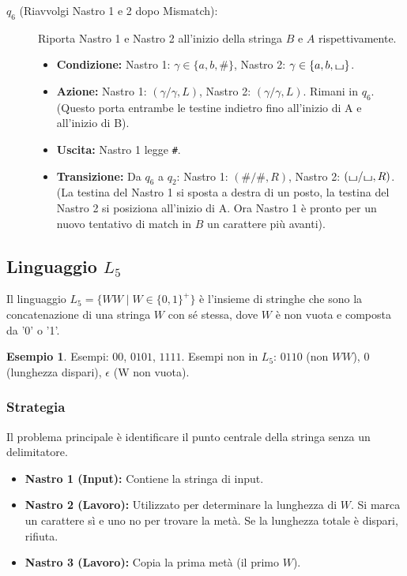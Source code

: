 \documentclass[a4paper]{article}
\theoremstyle{definition} %
\newtheorem{example}{Esempio}
\newcommand{\blankS}{\ensuremath{\raisebox{-0.15ex}{\scalebox{1.3}[0.7]{$\sqcup$}}}}
\begin{document}
\begin{description}
    \item[$q_6$ (Riavvolgi Nastro 1 e 2 dopo Mismatch):] Riporta Nastro 1 e Nastro 2 all'inizio della stringa $B$ e $A$ rispettivamente.
    \begin{itemize}
        \item \textbf{Condizione:} Nastro 1: $\gamma \in \{a,b,\#\}$, Nastro 2: $\gamma \in \{a,b,\blankS\}$.
        \item \textbf{Azione:} Nastro 1: $(\gamma/\gamma, L)$, Nastro 2: $(\gamma/\gamma, L)$. Rimani in $q_6$. (Questo porta entrambe le testine indietro fino all'inizio di A e all'inizio di B).
        \item \textbf{Uscita:} Nastro 1 legge \texttt{\#}.
        \item \textbf{Transizione:} Da $q_6$ a $q_2$: Nastro 1: $(\#/\#, R)$, Nastro 2: $(\blankS/\blankS, R)$. (La testina del Nastro 1 si sposta a destra di un posto, la testina del Nastro 2 si posiziona all'inizio di A. Ora Nastro 1 è pronto per un nuovo tentativo di match in $B$ un carattere più avanti).
    \end{itemize}
\end{description}

\subsection{Linguaggio $L_5$}
Il linguaggio $L_5 = \{WW \mid W \in \{0,1\}^+\}$ è l'insieme di stringhe che sono la concatenazione di una stringa $W$ con sé stessa, dove $W$ è non vuota e composta da '0' o '1'.
\begin{example}
Esempi: $00$, $0101$, $1111$.
Esempi non in $L_5$: $0110$ (non $WW$), $0$ (lunghezza dispari), $\epsilon$ (W non vuota).
\end{example}

\subsubsection{Strategia}
Il problema principale è identificare il punto centrale della stringa senza un delimitatore.
\begin{itemize}
    \item \textbf{Nastro 1 (Input):} Contiene la stringa di input.
    \item \textbf{Nastro 2 (Lavoro):} Utilizzato per determinare la lunghezza di $W$. Si marca un carattere sì e uno no per trovare la metà. Se la lunghezza totale è dispari, rifiuta.
    \item \textbf{Nastro 3 (Lavoro):} Copia la prima metà (il primo $W$).
\end{itemize}
\end{document}
